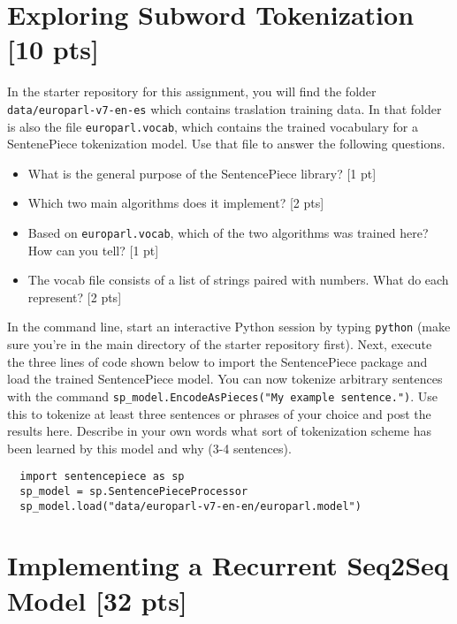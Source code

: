 \documentclass[11pt]{article}
\begin{document}
\section{Exploring Subword Tokenization [10 pts]}
In the starter repository for this assignment, you will find the folder \texttt{data/europarl-v7-en-es} which contains traslation training data. In that folder is also the file \texttt{europarl.vocab}, which contains the trained vocabulary for a SentenePiece tokenization model. Use that file to answer the following questions.

\vspace{2em}
\begin{itemize}
  \item What is the general purpose of the SentencePiece library? [1 pt]
  \item Which two main algorithms does it implement? [2 pts]
  \item Based on \texttt{europarl.vocab}, which of the two algorithms was trained here? How can you tell? [1 pt]
  \item The vocab file consists of a list of strings paired with numbers. What do each represent? [2 pts]
\end{itemize}

\vspace{2em}
 In the command line, start an interactive Python session by typing \texttt{python} (make sure you're in the main directory of the starter repository first). Next, execute the three lines of code shown below to import the SentencePiece package and load the trained SentencePiece model. You can now tokenize arbitrary sentences with the command \texttt{sp\_model.EncodeAsPieces("My example sentence.")}. Use this to tokenize at least three sentences or phrases of your choice and post the results here. Describe in your own words what sort of tokenization scheme has been learned by this model and why (3-4 sentences).

\begin{lstlisting}
  import sentencepiece as sp
  sp_model = sp.SentencePieceProcessor
  sp_model.load("data/europarl-v7-en-en/europarl.model")
\end{lstlisting}

\section{Implementing a Recurrent Seq2Seq Model [32 pts]}
\end{document}
